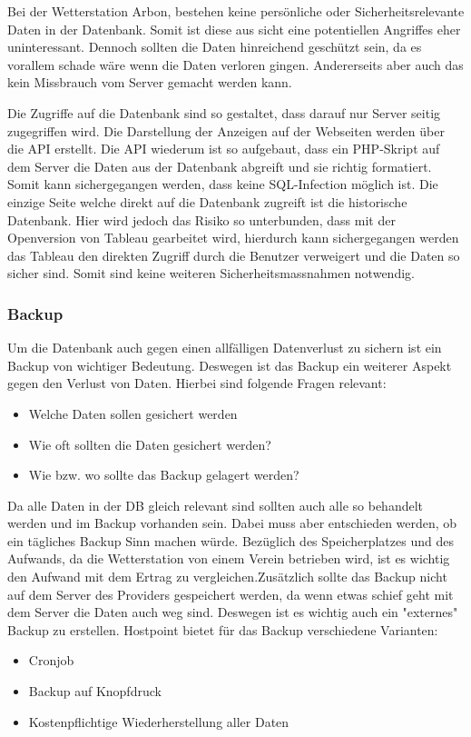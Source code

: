 Bei der Wetterstation Arbon, bestehen keine persönliche oder Sicherheitsrelevante Daten in der Datenbank. Somit ist diese aus sicht eine potentiellen Angriffes eher uninteressant. Dennoch sollten die Daten hinreichend geschützt sein, da es vorallem schade wäre wenn die Daten verloren gingen. Andererseits aber auch das kein Missbrauch vom Server gemacht werden kann.

Die Zugriffe auf die Datenbank sind so gestaltet, dass darauf nur Server seitig zugegriffen wird. Die Darstellung der Anzeigen auf der Webseiten werden über die API erstellt. Die API wiederum ist so aufgebaut, dass ein PHP-Skript auf dem Server die Daten aus der Datenbank abgreift und sie richtig formatiert. Somit kann sichergegangen werden, dass keine SQL-Infection möglich ist. Die einzige Seite welche direkt auf die Datenbank zugreift ist die historische Datenbank. Hier wird jedoch das Risiko so unterbunden, dass mit der Openversion von Tableau gearbeitet wird, hierdurch kann sichergegangen werden das Tableau den direkten Zugriff durch die Benutzer verweigert und die Daten so sicher sind. Somit sind keine weiteren Sicherheitsmassnahmen notwendig.

\subsubsection{Backup}

Um die Datenbank auch gegen einen allfälligen Datenverlust zu sichern ist ein Backup von wichtiger Bedeutung. Deswegen ist das Backup ein weiterer Aspekt gegen den Verlust von Daten. Hierbei sind folgende Fragen relevant:
\begin{itemize}
\item Welche Daten sollen gesichert werden
\item Wie oft sollten die Daten gesichert werden?
\item Wie bzw. wo sollte das Backup gelagert werden?
\end{itemize}

Da alle Daten in der DB gleich relevant sind sollten auch alle so behandelt werden und im Backup vorhanden sein. Dabei muss aber entschieden werden, ob ein tägliches Backup Sinn machen würde. Bezüglich des Speicherplatzes und des Aufwands, da die Wetterstation von einem Verein betrieben wird, ist es wichtig den Aufwand mit dem Ertrag zu vergleichen.Zusätzlich sollte das Backup nicht auf dem Server des Providers gespeichert werden, da wenn etwas schief geht mit dem Server die Daten auch weg sind. Deswegen ist es wichtig auch ein "externes" Backup zu erstellen. Hostpoint bietet für das Backup verschiedene Varianten:
\begin{itemize}
\item Cronjob
\item Backup auf Knopfdruck
\item Kostenpflichtige Wiederherstellung aller Daten
\end{itemize}


